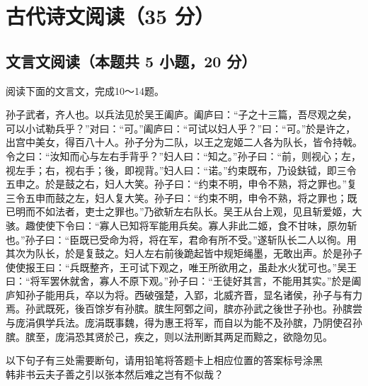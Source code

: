 \documentclass[zihao = -4]{exam-zh}
\begin{document}
       \section{古代诗文阅读（35 分）}

       \subsection{文言文阅读（本题共 5 小题，20 分）}

       阅读下面的文言文，完成10～14题。

       \begin{material}[source = (节选自《七十列传·孙子吴起列传原文
》)]

         孙子武者，齐人也。以兵法见於吴王阖庐。阖庐曰：“子之十三篇，吾尽观之矣，可以小试勒兵乎？”对曰：“可。”阖庐曰：“可试以妇人乎？”曰：“可。”於是许之，出宫中美女，得百八十人。孙子分为二队，以王之宠姬二人各为队长，皆令持戟。令之曰：“汝知而心与左右手背乎？”妇人曰：“知之。”孙子曰：“前，则视心；左，视左手；右，视右手；後，即视背。”妇人曰：“诺。”约束既布，乃设鈇钺，即三令五申之。於是鼓之右，妇人大笑。孙子曰：“约束不明，申令不熟，将之罪也。”复三令五申而鼓之左，妇人复大笑。孙子曰：“约束不明，申令不熟，将之罪也；既已明而不如法者，吏士之罪也。”乃欲斩左右队长。吴王从台上观，见且斩爱姬，大骇。趣使使下令曰：“寡人已知将军能用兵矣。寡人非此二姬，食不甘味，原勿斩也。”孙子曰：“臣既已受命为将，将在军，君命有所不受。”遂斩队长二人以徇。用其次为队长，於是复鼓之。妇人左右前後跪起皆中规矩绳墨，无敢出声。於是孙子使使报王曰：“兵既整齐，王可试下观之，唯王所欲用之，虽赴水火犹可也。”吴王曰：“将军罢休就舍，寡人不原下观。”孙子曰：“王徒好其言，不能用其实。”於是阖庐知孙子能用兵，卒以为将。西破强楚，入郢，北威齐晋，显名诸侯，孙子与有力焉。孙武既死，後百馀岁有孙膑。膑生阿鄄之间，膑亦孙武之後世子孙也。孙膑尝与庞涓俱学兵法。庞涓既事魏，得为惠王将军，而自以为能不及孙膑，乃阴使召孙膑。膑至，庞涓恐其贤於己，疾之，则以法刑断其两足而黥之，欲隐勿见。
\\

       \end{material}


       \begin{question}
         以下句子有三处需要断句，请用铅笔将答题卡上相应位置的答案标号涂黑\\
        韩非书云夫子善之引以张本然后难之岂有不似哉？

       \end{question}
\end{document}
